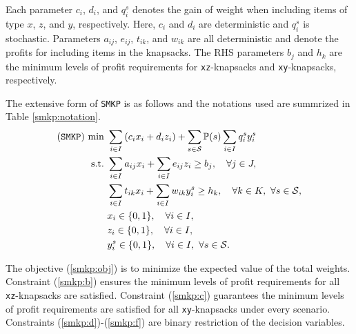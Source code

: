 Each parameter $c_i$, $d_i$, and $q_i^s$ denotes the gain of weight when including items of type $x$, $z$, and $y$, respectively. Here, $c_i$ and $d_i$ are deterministic and $q_i^s$ is stochastic. Parameters $a_{ij}$, $e_{ij}$, $t_{ik}$, and $w_{ik}$ are all deterministic and denote the profits for including items in the knapsacks. The RHS parameters $b_j$ and $h_k$ are the minimum levels of profit requirements for \texttt{xz}-knapsacks and \texttt{xy}-knapsacks, respectively.

The extensive form of \texttt{SMKP} is as follows and the notations used are summrized in Table \ref{smkp:notation}.
\begin{subequations}
	\begin{align}
	(\texttt{SMKP})\ \textrm{min}\ &\sum_{i \in I}\left(c_i x_i + d_i z_i\right) + \sum_{s\in\mathcal{S}}\operatorname*{\mathbb{P}}(s)\sum_{i\in I}q_i^s y_i^s \label{smkp:obj}\\
	\textrm{s.t.}\ &  \sum_{i\in I}a_{ij}x_{i} + \sum_{i \in I}e_{ij}z_i\ge b_j,\quad\forall j\in J, \label{smkp:b}\\
	&  \sum_{i\in I} t_{ik}x_i + \sum_{i\in I}w_{ik} y_i^s\ge h_k,\quad\forall k\in K,\ \forall s\in\mathcal{S}, \label{smkp:c}\\
	&  x_i\in\{0,1\},\quad\forall i\in I, \label{smkp:d}\\
	&  z_i\in\{0,1\},\quad\forall i\in I, \label{smkp:e}\\
	&  y_i^s\in\{0,1\},\quad\forall i\in I,\ \forall s\in \mathcal{S}. \label{smkp:f}
	\end{align}
\end{subequations}

The objective (\ref{smkp:obj}) is to minimize the expected value of the total weights. Constraint (\ref{smkp:b}) ensures the minimum levels of profit requirements for all \texttt{xz}-knapsacks are satisfied. Constraint (\ref{smkp:c}) guarantees the minimum levels of profit requirements are satisfied for all \texttt{xy}-knapsacks under every scenario. Constraints (\ref{smkp:d})-(\ref{smkp:f}) are binary restriction of the decision variables.


